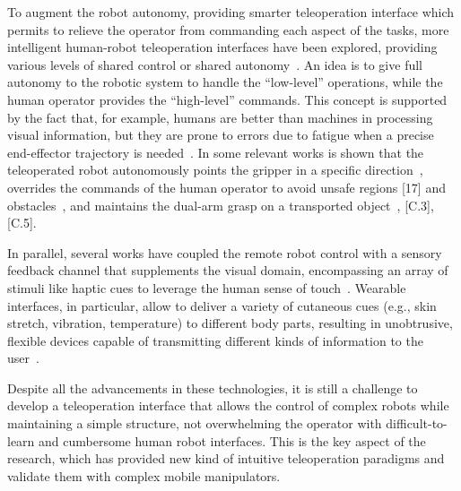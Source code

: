 To augment the robot autonomy, providing smarter teleoperation interface which permits to relieve the operator from commanding each aspect of the tasks, more intelligent human-robot teleoperation interfaces have been explored, providing various levels of shared control or shared autonomy~\cite{Selvaggio2021}. An idea is to give full autonomy to the robotic system to handle the \enquote{low-level} operations, while the human operator provides the \enquote{high-level} commands. This concept is supported by the fact that, for example, humans are better than machines in processing visual information, but they are prone to errors due to fatigue when a precise end-effector trajectory is needed~\cite{Yang2018}⁠. In some relevant works is shown that the teleoperated robot autonomously points the gripper in a specific direction~\cite{Abi2016}, overrides the commands of the human operator to avoid unsafe regions [17] and obstacles~\cite{Masone2018}, and maintains the dual-arm grasp on a transported object~\cite{Shahbazi2017, Laghi2018}, [C.3], [C.5].

In parallel, several works have coupled the remote robot control with a sensory feedback channel that supplements the visual domain, encompassing an array of stimuli like haptic cues to leverage the human sense of touch~\cite{Dargahi2004, Pacchierotti2015}. Wearable interfaces, in particular, allow to deliver a variety of cutaneous cues (e.g., skin stretch, vibration, temperature) to different body parts, resulting in unobtrusive, flexible devices capable of transmitting different kinds of information to the user~\cite{pacchierotti2017wearable}. 
%

Despite all the advancements in these technologies, it is still a challenge to develop a teleoperation interface that allows the control of complex robots while maintaining a simple structure, not overwhelming the operator with difficult-to-learn and cumbersome human robot interfaces. This is the key aspect of the research, which has provided new kind of intuitive teleoperation paradigms and validate them with complex mobile manipulators.